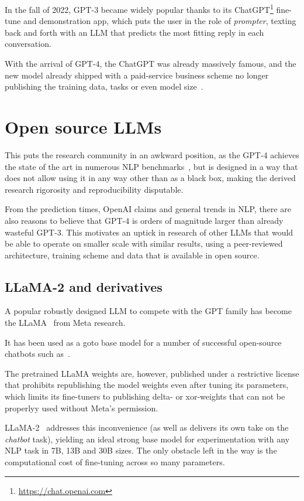 In the fall of 2022, GPT-3 became widely popular thanks to its \textsf{ChatGPT}\footnote{\url{https://chat.openai.com}} fine-tune and demonstration app, which puts the user in the role of \textit{prompter}, texting back and forth with an LLM that predicts the most fitting reply in each conversation.

With the arrival of GPT-4, the \textsf{ChatGPT} was already massively famous, and the new model already shipped with a paid-service business scheme no longer publishing the training data, tasks or even model size~\cite{gpt4}.

\section{Open source LLMs}
This puts the research community in an awkward position, as the GPT-4 achieves the state of the art in numerous NLP benchmarks~, but is designed in a way that does not allow using it in any way other than as a black box, making the derived research rigorosity and reproducibility disputable.

From the prediction times, \textsf{OpenAI} claims and general trends in NLP, there are also reasons to believe that GPT-4 is orders of magnitude larger than already wasteful GPT-3.
This motivates an uptick in research of other LLMs that would be able to operate on smaller scale with similar results, using a peer-reviewed architecture, training scheme and data that is available in open source.

\subsection{LLaMA-2 and derivatives}
\label{sec:llama}

A popular robustly designed LLM to compete with the GPT family has become the \textsf{LLaMA}~\cite{llama} from \textsf{Meta research}. 

It has been used as a goto base model for a number of successful open-source chatbots such as~\cite{vicuna,alpaca,openassistant}.

The pretrained LLaMA weights are, however, published under a restrictive license that prohibits republishing the model weights even after tuning its parameters, which limits its fine-tuners to publishing delta- or xor-weights that can not be properlyy used without \textsf{Meta}'s permission.

LLaMA-2~\cite{llama2} addresses this inconvenience (as well as delivers its own take on the \textit{chatbot} task), yielding an ideal strong base model for experimentation with any NLP task in 7B, 13B and 30B sizes.
The only obstacle left in the way is the computational cost of fine-tuning across so many parameters.


